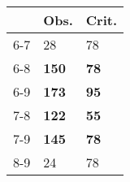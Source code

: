 \begin{table}[ht]
\centering
\begin{tabular}{rll}
  \hline
 & Obs. & Crit. \\ 
  \hline
6-7 & 28 & 78 \\ 
  6-8 & \textbf{150} & \textbf{78} \\ 
  6-9 & \textbf{173} & \textbf{95} \\ 
  7-8 & \textbf{122} & \textbf{55} \\ 
  7-9 & \textbf{145} & \textbf{78} \\ 
  8-9 & 24 & 78 \\ 
   \hline
\end{tabular}
\end{table}
